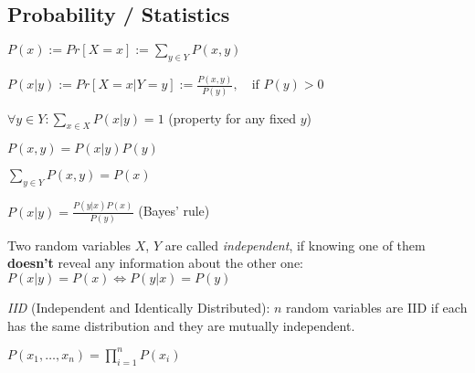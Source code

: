 \documentclass[a4paper, 11pt, landscape]{article}
\begin{document}
\begin{multicols*}{3}
\section{Probability / Statistics}
\begin{compactitem}
	\item $P(x) := Pr[X = x] := \sum_{y \in Y} P(x, y)$
	\item $P(x|y) := Pr[X = x | Y = y] := \frac{P(x,y)}{P(y)},\quad \text{if } P(y) > 0$
	\item $\forall y \in Y: \sum_{x \in X} P(x|y) = 1$ (property for any fixed $y$)
	\item $P(x, y) = P(x|y) P(y)$
	\item $\sum_{y \in Y} P(x, y) = P(x)$
	\item $P(x|y) = \frac{P(y|x)P(x)}{P(y)}$ (Bayes' rule)
	\item Two random variables $X$, $Y$ are called \emph{independent}, if knowing one of them \textbf{doesn't} reveal any information about the other one: $P(x|y) = P(x) \Leftrightarrow P(y|x) = P(y)$
	\item \emph{IID} (Independent and Identically Distributed): $n$ random variables are IID if each has the same distribution and they are mutually independent.
	\begin{compactitem}
		\item $P(x_1, \ldots, x_n) = \prod_{i=1}^n P(x_i)$
	\end{compactitem}
\end{compactitem}


\end{multicols*}
\end{document}
